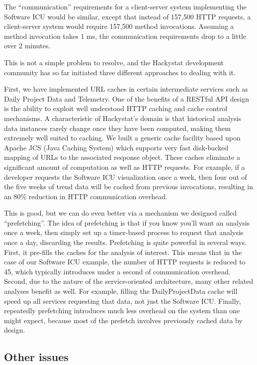 \documentclass[conference,compsoc,peerreview]{IEEEtran}
\begin{document}
The ``communication'' requirements for a client-server system implementing
the Software ICU would be similar, except that instead of 157,500 HTTP
requests, a client-server system would require 157,500 method invocations.
Assuming a method invocation takes 1 ms, the communication requirements
drop to a little over 2 minutes.

This is not a simple problem to resolve, and the Hackystat development
community has so far initiated three different approaches to dealing with
it.

First, we have implemented URL caches in certain intermediate services such
as Daily Project Data and Telemetry.  One of the benefits of a RESTful API
design is the ability to exploit well understood HTTP caching and cache
control mechanisms.  A characteristic of Hackystat's domain is that
historical analysis data instances rarely change once they have been
computed, making them extremely well suited to caching.  We built a generic
cache facility based upon Apache JCS (Java Caching System) which supports
very fast disk-backed mapping of URLs to the associated response
object. These caches eliminate a significant amount of computation as well
as HTTP requests.  For example, if a developer requests the Software ICU
visualization once a week, then four out of the five weeks of trend data
will be cached from previous invocations, resulting in an 80\% reduction in
HTTP communication overhead.

This is good, but we can do even better via a mechanism we designed called
``prefetching''.  The idea of prefetching is that if you know you'll want
an analysis once a week, then simply set up a timer-based process to
request that analysis once a day, discarding the results.  Prefetching is
quite powerful in several ways.  First, it pre-fills the caches for the
analysis of interest. This means that in the case of our Software ICU
example, the number of HTTP requests is reduced to 45, which typically introduces under a
second of communication overhead.  Second, due to the nature of the
service-oriented architecture, many other related analyses benefit as
well. For example, filling the DailyProjectData cache will speed up all
services requesting that data, not just the Software ICU.  Finally,
repeatedly prefetching introduces much less overhead on the system than one
might expect, because most of the prefetch involves previously cached data
by design.

\subsection{Other issues}
\end{document}
